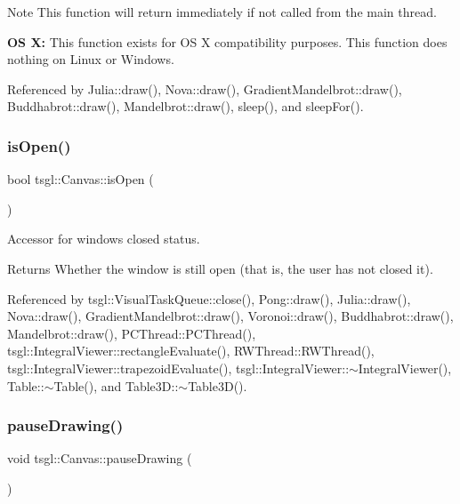 \begin{DoxyNote}{Note}
This function will return immediately if not called from the main thread. 

{\bfseries OS X\+:} This function exists for OS X compatibility purposes. This function does nothing on Linux or Windows. 
\end{DoxyNote}


Referenced by Julia\+::draw(), Nova\+::draw(), Gradient\+Mandelbrot\+::draw(), Buddhabrot\+::draw(), Mandelbrot\+::draw(), sleep(), and sleep\+For().

\mbox{\label{classtsgl_1_1_canvas_ada31408e9a96ecb1639f552d8f0de475}} 
\subsubsection{\texorpdfstring{is\+Open()}{isOpen()}}
{\footnotesize\ttfamily bool tsgl\+::\+Canvas\+::is\+Open (\begin{DoxyParamCaption}{ }\end{DoxyParamCaption})}



Accessor for window\textquotesingle{}s closed status. 

\begin{DoxyReturn}{Returns}
Whether the window is still open (that is, the user has not closed it). 
\end{DoxyReturn}


Referenced by tsgl\+::\+Visual\+Task\+Queue\+::close(), Pong\+::draw(), Julia\+::draw(), Nova\+::draw(), Gradient\+Mandelbrot\+::draw(), Voronoi\+::draw(), Buddhabrot\+::draw(), Mandelbrot\+::draw(), P\+C\+Thread\+::\+P\+C\+Thread(), tsgl\+::\+Integral\+Viewer\+::rectangle\+Evaluate(), R\+W\+Thread\+::\+R\+W\+Thread(), tsgl\+::\+Integral\+Viewer\+::trapezoid\+Evaluate(), tsgl\+::\+Integral\+Viewer\+::$\sim$\+Integral\+Viewer(), Table\+::$\sim$\+Table(), and Table3\+D\+::$\sim$\+Table3\+D().

\mbox{\label{classtsgl_1_1_canvas_abe021ab5148cc1327523689bced0f35a}} 
\subsubsection{\texorpdfstring{pause\+Drawing()}{pauseDrawing()}}
{\footnotesize\ttfamily void tsgl\+::\+Canvas\+::pause\+Drawing (\begin{DoxyParamCaption}{ }\end{DoxyParamCaption})}



